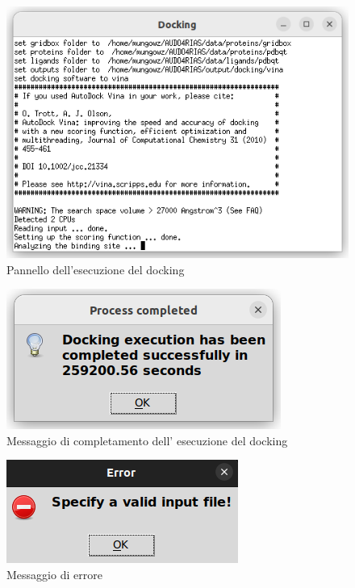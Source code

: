\begin{figure}[H]
    \centering
    \includegraphics[scale=0.8]{immagini/capitolo3/dockingExecution.png}
    \caption{Pannello dell'esecuzione del docking}
    \label{fig:docking execution}
\end{figure}

\begin{figure}[H]
    \centering
    \includegraphics{immagini/capitolo3/progressCompletedDocking.png}
    \caption{Messaggio di completamento dell' esecuzione del docking}
    \label{fig:progress completed docking}
\end{figure}

\begin{figure}[H]
    \centering
    \includegraphics{immagini/capitolo3/invalidInputDocking.png}
    \caption{Messaggio di errore}
    \label{fig:invalid input docking}
\end{figure}

